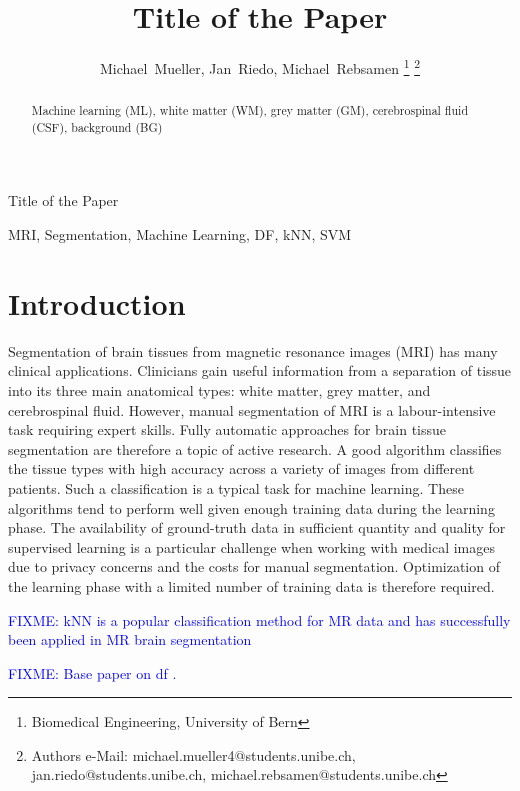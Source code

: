 \documentclass[journal]{IEEEtran}
\newcommand\FIXME[1]{\textcolor{blue}{FIXME: #1}}
\begin{document}
\title{Title of the Paper}


\author{Michael~Mueller,
        Jan~Riedo,
        Michael~Rebsamen%
\thanks{Biomedical Engineering, University of Bern}%
\thanks{Authors e-Mail: michael.mueller4@students.unibe.ch, jan.riedo@students.unibe.ch, michael.rebsamen@students.unibe.ch}}%
%
{Title of the Paper}
\maketitle

\begin{abstract}
Machine learning (ML), white matter (WM), grey matter (GM), cerebrospinal fluid (CSF), background (BG)
\end{abstract}
\begin{IEEEkeywords}
MRI, Segmentation, Machine Learning, DF, kNN, SVM
\end{IEEEkeywords}


\section{Introduction}
Segmentation of brain tissues from magnetic resonance images (MRI) has many clinical applications. Clinicians gain useful information from a separation of tissue into its three main anatomical types: white matter, grey matter, and cerebrospinal fluid. However, manual segmentation of MRI is a labour-intensive task requiring expert skills. Fully automatic approaches for brain tissue segmentation are therefore a topic of active research. A good algorithm classifies the tissue types with high accuracy across a variety of images from different patients. Such a classification is a typical task for machine learning. These algorithms tend to perform well given enough training data during the learning phase. The availability of ground-truth data in sufficient quantity and quality for supervised learning is a particular challenge when working with medical images due to privacy concerns and the costs for manual segmentation. Optimization of the learning phase with a limited number of training data is therefore required.

\FIXME{kNN is a popular classification method for MR data and has successfully been applied in MR brain segmentation\cite{Anbeek2004,Cocosco2003,Warfield2000}}

\FIXME{Base paper on df \cite{Breiman2001}.}
\end{document}
